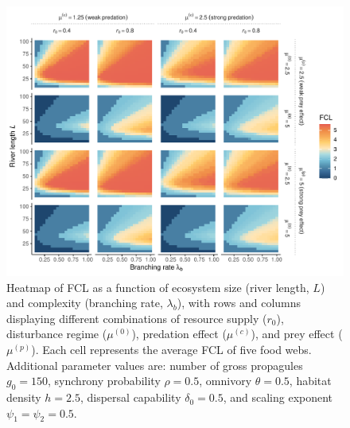 \begin{figure}
\centering
\includegraphics{../data_fmt/fig_rho05_g150_theta05.pdf}
\caption{Heatmap of FCL as a function of ecosystem size (river length,
\(L\)) and complexity (branching rate, \(\lambda_b\)), with rows and
columns displaying different combinations of resource supply (\(r_0\)),
disturbance regime (\(\mu^{(0)}\)), predation effect (\(\mu^{(c)}\)),
and prey effect (\(\mu^{(p)}\)). Each cell represents the average FCL of
five food webs. Additional parameter values are: number of gross
propagules \(g_0=150\), synchrony probability \(\rho=0.5\), omnivory
\(\theta=0.5\), habitat density \(h=2.5\), dispersal capability
\(\delta_0=0.5\), and scaling exponent \(\psi_1=\psi_2=0.5\).}
\end{figure}

\newpage
